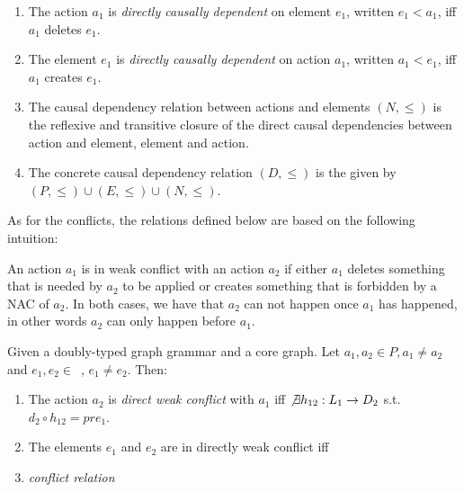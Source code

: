 \begin{definition}
  \begin{enumerate}\addtocounter{enumi}{4}
    \item The action $a_1$ is \emph{directly causally dependent} on element $e_1$, written $e_1 < a_1$, iff $a_1$ deletes $e_1$. 
    \item The element $e_1$ is \emph{directly causally dependent} on action $a_1$, written $a_1 < e_1$, iff $a_1$ creates $e_1$.
    \item The causal dependency relation between actions and elements $(N, \leq)$ is the reflexive and transitive closure of the direct causal dependencies between action and element, element and action.
    \item The concrete causal dependency relation $(D, \leq)$ is the given by \mbox{$(P, \leq) \cup (E, \leq) \cup (N, \leq)$}.
  \end{enumerate}
\end{definition}


As for the conflicts, the relations defined below are based on the following intuition: 

\begin{intuition} An action $a_1$ is in weak conflict with an action $a_2$ if either $a_1$ deletes something that is needed by $a_2$ to be applied or creates something that is forbidden by a NAC of $a_2$. In both cases, we have that $a_2$ can not happen once $a_1$ has happened, in other words $a_2$ can only happen before $a_1$.
\end{intuition}


\begin{definition} Given \doublyTypedGraphGrammarCore{} a doubly-typed graph grammar and \coreGraph{} a core graph. Let $a_1, a_2 \in P, a_1 \ne a_2$ and \mbox{$e_1, e_2 \in $ \coreGraph{},} $e_1 \ne e_2$. Then: 

  \begin{enumerate}
    \item The action $a_2$ is \emph{direct weak conflict} with $a_1$ iff $\not\exists h_{12} : L_1 \rightarrow D_2$ s.t. \mbox{$d_2 \circ h_{12} = pre_1$}.

   \item The elements $e_1$ and $e_2$ are in directly weak conflict iff 
    \item \emph{conflict relation}
  \end{enumerate}
\end{definition}

